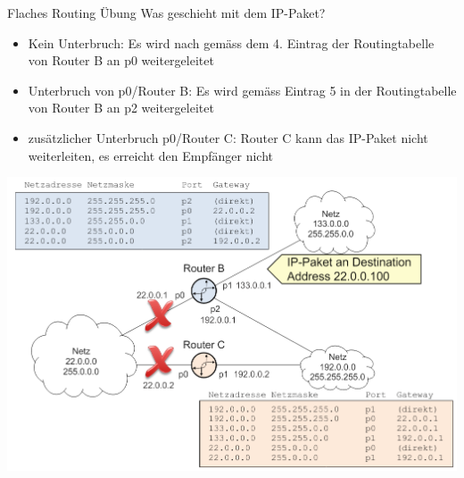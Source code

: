 \begin{example2}{Flaches Routing Übung}
Was geschieht mit dem IP-Paket?
    \begin{itemize}
        \item Kein Unterbruch: Es wird nach gemäss dem 4. Eintrag der Routingtabelle von Router B an p0 weitergeleitet
        \item Unterbruch von p0/Router B: Es wird gemäss Eintrag 5 in der Routingtabelle von Router B an p2 weitergeleitet
        \item zusätzlicher Unterbruch p0/Router C: Router C kann das IP-Paket nicht weiterleiten, es erreicht den Empfänger nicht
    \end{itemize}
        \includegraphics[width=1\linewidth]{images/flaches_routing_bsp.png}
\end{example2}

